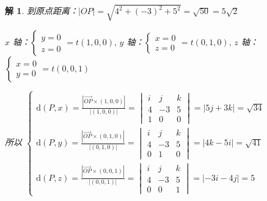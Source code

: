 \documentclass[a4paper,12pt]{article}
\newtheorem*{解}{解}
\begin{document}
\begin{解}
到原点距离：$|OP|=\sqrt{4^2+(-3)^2+5^2}=\sqrt{50}=5\sqrt{2}$

$x$ 轴：$\begin{cases}y=0\\z=0\end{cases}=t(1,0,0),\,y$ 轴：$\begin{cases}x=0\\z=0\end{cases}=t(0,1,0),\,z$ 轴：$\begin{cases}x=0\\y=0\end{cases}=t(0,0,1)$

所以 $\begin{cases}
        \text{d}(P,x)=\frac{\left|\overrightarrow{OP}\times(1,0,0)\right|}{\left|(1,0,0)\right|}=\begin{vmatrix}
                                                                                                     i & j  & k \\
                                                                                                     4 & -3 & 5 \\
                                                                                                     1 & 0  & 0
                                                                                                 \end{vmatrix}=|5j+3k|=\sqrt{34} \\
        \text{d}(P,y)=\frac{\left|\overrightarrow{OP}\times(0,1,0)\right|}{\left|(0,1,0)\right|}=\begin{vmatrix}
                                                                                                     i & j  & k \\
                                                                                                     4 & -3 & 5 \\
                                                                                                     0 & 1  & 0
                                                                                                 \end{vmatrix}=|4k-5i|=\sqrt{41} \\
        \text{d}(P,z)=\frac{\left|\overrightarrow{OP}\times(0,0,1)\right|}{\left|(0,0,1)\right|}=\begin{vmatrix}
                                                                                                     i & j  & k \\
                                                                                                     4 & -3 & 5 \\
                                                                                                     0 & 0  & 1
                                                                                                 \end{vmatrix}=|-3i-4j|=5
    \end{cases}$
\end{解}
\end{document}
